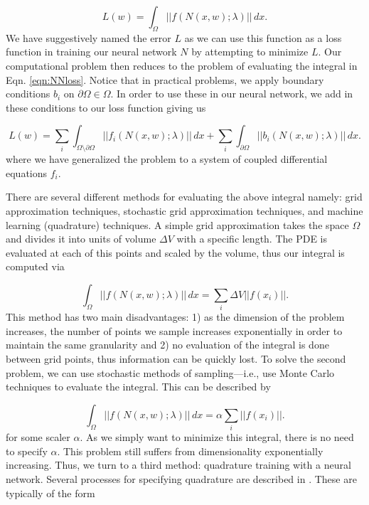 \documentclass{CUP-JNL-DTM}%
\theoremstyle{definition}
\numberwithin{equation}{section}
\begin{document}
\begin{equation}
	L(w) = \int_{\Omega} ||f(N(x,w); \lambda)||\,dx. 
	\label{eqn:NNloss}
\end{equation}
We have suggestively named the error $L$ as we can use this function as a loss function in training our neural network $N$ by attempting to minimize $L$. Our computational problem then reduces to the problem of evaluating the integral in Eqn. \ref{eqn:NNloss}. Notice that in practical problems, we apply boundary conditions $b_i$ on $\partial \Omega \in \Omega$. In order to use these in our neural network, we add in these conditions to our loss function giving us 

\begin{equation}
	L(w) = \sum_i\int_{\Omega\setminus\partial\Omega} ||f_i(N(x,w); \lambda)||\,dx + \sum_i\int_{\partial\Omega} ||b_i(N(x,w); \lambda)||\,dx.
	\label{eqn:complete_loss} 
\end{equation}
where we have generalized the problem to a system of coupled differential equations $f_i$. 

There are several different methods for evaluating the above integral namely: grid approximation techniques, stochastic grid approximation techniques, and machine learning (quadrature) techniques. A simple grid approximation takes the space $\Omega$ and divides it into units of volume $\Delta V$ with a specific length. The PDE is evaluated at each of this points and scaled by the volume, thus our integral is computed via 

\begin{equation}
	\int_{\Omega} ||f(N(x,w); \lambda)||\,dx = \sum_i \Delta V ||f(x_i)||.
\end{equation}
This method has two main disadvantages: 1) as the dimension of the problem increases, the number of points we sample increases exponentially in order to maintain the same granularity and 2) no evaluation of the integral is done between grid points, thus information can be quickly lost. To solve the second problem, we can use stochastic methods of sampling---i.e., use Monte Carlo techniques to evaluate the integral. This can be described by 

\begin{equation}
	\int_{\Omega} ||f(N(x,w); \lambda)||\,dx = \alpha \sum_i ||f(x_i)||.
\end{equation}
for some scaler $\alpha$. As we simply want to minimize this integral, there is no need to specify $\alpha$. This problem still suffers from dimensionality exponentially increasing. Thus, we turn to a third method: quadrature training with a neural network. Several processes for specifying quadrature are described in \cite{riveraQuadratureRulesSolving2022}. These are typically of the form 
\end{document}
